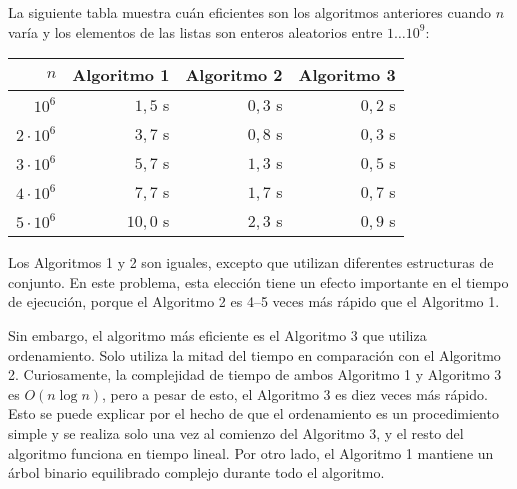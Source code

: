 La siguiente tabla muestra cuán eficientes
son los algoritmos anteriores cuando $n$ varía y
los elementos de las listas son enteros aleatorios
entre $1 \ldots 10^9$:

\begin{center}
    \begin{tabular}{rrrr}
        $n$            & Algoritmo 1 & Algoritmo 2 & Algoritmo 3 \\
        \hline
        $10^6$         & $1,5$ s     & $0,3$ s     & $0,2$ s     \\
        $2 \cdot 10^6$ & $3,7$ s     & $0,8$ s     & $0,3$ s     \\
        $3 \cdot 10^6$ & $5,7$ s     & $1,3$ s     & $0,5$ s     \\
        $4 \cdot 10^6$ & $7,7$ s     & $1,7$ s     & $0,7$ s     \\
        $5 \cdot 10^6$ & $10,0$ s    & $2,3$ s     & $0,9$ s     \\
    \end{tabular}
\end{center}

Los Algoritmos 1 y 2 son iguales, excepto que
utilizan diferentes estructuras de conjunto.
En este problema, esta elección tiene un efecto importante en
el tiempo de ejecución, porque el Algoritmo 2
es 4--5 veces más rápido que el Algoritmo 1.

Sin embargo, el algoritmo más eficiente es el Algoritmo 3
que utiliza ordenamiento.
Solo utiliza la mitad del tiempo en comparación con el Algoritmo 2.
Curiosamente, la complejidad de tiempo de ambos
Algoritmo 1 y Algoritmo 3 es $O(n \log n)$,
pero a pesar de esto, el Algoritmo 3 es diez veces más rápido.
Esto se puede explicar por el hecho de que
el ordenamiento es un procedimiento simple y se realiza
solo una vez al comienzo del Algoritmo 3,
y el resto del algoritmo funciona en tiempo lineal.
Por otro lado,
el Algoritmo 1 mantiene un árbol binario equilibrado complejo
durante todo el algoritmo.